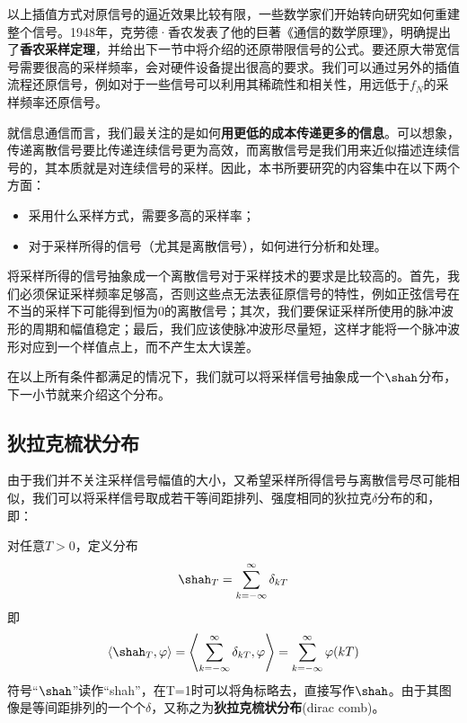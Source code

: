 以上插值方式对原信号的逼近效果比较有限，一些数学家们开始转向研究如何重建整个信号。1948年，克劳德·香农发表了他的巨著《通信的数学原理》，明确提出了\textbf{香农采样定理}，并给出下一节中将介绍的还原带限信号的公式。要还原大带宽信号需要很高的采样频率，会对硬件设备提出很高的要求。我们可以通过另外的插值流程还原信号，例如对于一些信号可以利用其稀疏性和相关性，用远低于$f_N$的采样频率还原信号。

就信息通信而言，我们最关注的是如何\textbf{用更低的成本传递更多的信息}。可以想象，传递离散信号要比传递连续信号更为高效，而离散信号是我们用来近似描述连续信号的，其本质就是对连续信号的采样。因此，本书所要研究的内容集中在以下两个方面：\begin{itemize}
    \item 采用什么采样方式，需要多高的采样率；
    \item 对于采样所得的信号（尤其是离散信号），如何进行分析和处理。
\end{itemize}

将采样所得的信号抽象成一个离散信号对于采样技术的要求是比较高的。首先，我们必须保证采样频率足够高，否则这些点无法表征原信号的特性，例如正弦信号在不当的采样下可能得到恒为0的离散信号；其次，我们要保证采样所使用的脉冲波形的周期和幅值稳定；最后，我们应该使脉冲波形尽量短，这样才能将一个脉冲波形对应到一个样值点上，而不产生太大误差。

在以上所有条件都满足的情况下，我们就可以将采样信号抽象成一个$\shah$分布，下一小节就来介绍这个分布。

\subsection{狄拉克梳状分布}\label{sub:dirac_comb}
由于我们并不关注采样信号幅值的大小，又希望采样所得信号与离散信号尽可能相似，我们可以将采样信号取成若干等间距排列、强度相同的狄拉克$\delta$分布的和，即：
\begin{definition}[狄拉克梳状分布]\label{def:shah}
    对任意$T>0$，定义分布
    \begin{equation*}
        \shah_T=\sum_{k=-\infty}^{\infty}\delta_{kT}
    \end{equation*}
    即\[\langle \shah_T,\varphi\rangle=\left\langle \sum_{k=-\infty}^{\infty}\delta_{kT},\varphi\right\rangle=\sum_{k=-\infty}^{\infty}\varphi(kT)\]
    符号“$\shah$”读作“shah”，在T=1时可以将角标略去，直接写作$\shah$\cite{brad_osgood_ee261}。由于其图像是等间距排列的一个个$\delta$，又称之为\textbf{狄拉克梳状分布}(dirac comb)。
\end{definition}

